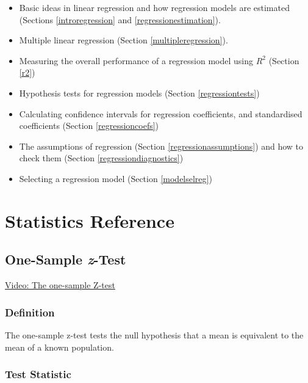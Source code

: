 \documentclass[
]{book}
\providecommand{\tightlist}{%
  \setlength{\itemsep}{0pt}\setlength{\parskip}{0pt}}
\begin{document}
\begin{itemize}
\tightlist
\item
  Basic ideas in linear regression and how regression models are estimated (Sections \ref{introregression} and \ref{regressionestimation}).
\item
  Multiple linear regression (Section \ref{multipleregression}).
\item
  Measuring the overall performance of a regression model using \(R^2\) (Section \ref{r2})
\item
  Hypothesis tests for regression models (Section \ref{regressiontests})
\item
  Calculating confidence intervals for regression coefficients, and standardised coefficients (Section \ref{regressioncoefs})
\item
  The assumptions of regression (Section \ref{regressionassumptions}) and how to check them (Section \ref{regressiondiagnostics})
\item
  Selecting a regression model (Section \ref{modelselreg})
\end{itemize}

\hypertarget{statistics-reference}{%
\chapter{Statistics Reference}\label{statistics-reference}}

\hypertarget{one-sample-z-test}{%
\section{\texorpdfstring{One-Sample \emph{z}-Test}{One-Sample z-Test}}\label{one-sample-z-test}}

\href{https://youtu.be/TE61rB6ajTY}{Video: The one-sample Z-test}

\hypertarget{definition}{%
\subsection{Definition}\label{definition}}

The one-sample z-test tests the null hypothesis that a mean is equivalent to the mean of a known population.

\hypertarget{test-statistic}{%
\subsection{Test Statistic}\label{test-statistic}}
\end{document}
